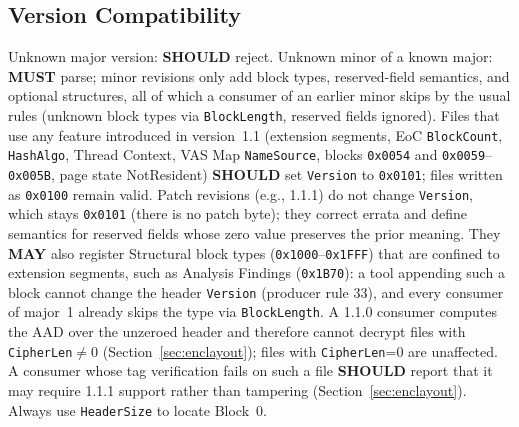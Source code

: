 \documentclass[11pt,a4paper]{article}
\newcommand{\MUST}{\textbf{MUST}}
\newcommand{\SHOULD}{\textbf{SHOULD}}
\newcommand{\MAY}{\textbf{MAY}}
\newcommand{\hex}[1]{\texttt{0x#1}}
\newcommand{\field}[1]{\texttt{#1}}
\begin{document}
\subsection{Version Compatibility}\label{sec:versioncompat}
Unknown major version: \SHOULD{} reject. Unknown minor of a known major: \MUST{} parse; minor revisions only add block types, reserved-field semantics, and optional structures, all of which a consumer of an earlier minor skips by the usual rules (unknown block types via \field{BlockLength}, reserved fields ignored). Files that use any feature introduced in version~1.1 (extension segments, EoC \field{BlockCount}, \field{HashAlgo}, Thread Context, VAS Map \field{NameSource}, blocks \hex{0054} and \hex{0059}--\hex{005B}, page state NotResident) \SHOULD{} set \field{Version} to \hex{0101}; files written as \hex{0100} remain valid. Patch revisions (e.g., 1.1.1) do not change \field{Version}, which stays \hex{0101} (there is no patch byte); they correct errata and define semantics for reserved fields whose zero value preserves the prior meaning. They \MAY{} also register Structural block types (\hex{1000}--\hex{1FFF}) that are confined to extension segments, such as Analysis Findings (\hex{1B70}): a tool appending such a block cannot change the header \field{Version} (producer rule 33), and every consumer of major~1 already skips the type via \field{BlockLength}. A 1.1.0 consumer computes the AAD over the unzeroed header and therefore cannot decrypt files with \field{CipherLen}$\neq$0 (Section~\ref{sec:enclayout}); files with \field{CipherLen}=0 are unaffected. A consumer whose tag verification fails on such a file \SHOULD{} report that it may require 1.1.1 support rather than tampering (Section~\ref{sec:enclayout}). Always use \field{HeaderSize} to locate Block~0.
\end{document}

